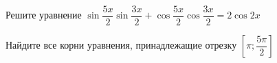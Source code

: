 \begin{ex}
	\begin{condition}
		\begin{enumcols}[label=\asbuk*)]
			\item Решите уравнение \( \sin {\dfrac{5x}{2}}\sin {\dfrac{3x}{2}}+\cos {\dfrac{5x}{2}}\cos {\dfrac{3x}{2}} = 2\cos 2x  \)
			\item Найдите все корни уравнения, принадлежащие отрезку \( \left[\pi;\dfrac{5\pi}{2}\right] \)
		\end{enumcols}
	\end{condition}
\end{ex}